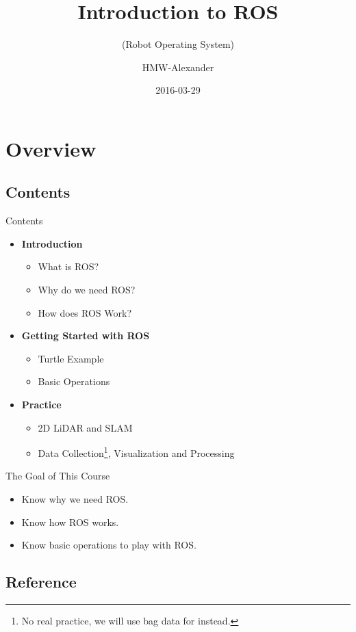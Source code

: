 \documentclass[10pt]{beamer}
\title{Introduction to ROS}
\subtitle{(Robot Operating System)}
\author{HMW-Alexander}
\date{2016-03-29}
\institute{Nagoya University}
\begin{document}
 
 \maketitle
 
 \section{Overview}
 
 \subsection{Contents}
 
 \begin{frame}{Contents}
  \begin{itemize}
   \item {\bf{Introduction}}
   \begin{itemize}
    \item What is ROS?
    \item Why do we need ROS?
    \item How does ROS Work?
   \end{itemize}
   \pause
   \item {\bf{Getting Started with ROS}}
   \begin{itemize}
    \item Turtle Example
    \item Basic Operations
   \end{itemize}
   \pause
   \item {\bf{Practice}}
   \begin{itemize}
    \item 2D LiDAR and SLAM
    \item Data Collection\footnote{No real practice, we will use bag data for instead.}, Visualization and Processing
   \end{itemize}
  \end{itemize}
  \pause
  \begin{block}{The Goal of This Course}
   \begin{itemize}
   \item Know why we need ROS.
   \item Know how ROS works.
   \item Know basic operations to play with ROS.
   \end{itemize}
  \end{block}
 \end{frame}
 
 \subsection{Reference}
 
\end{document}
